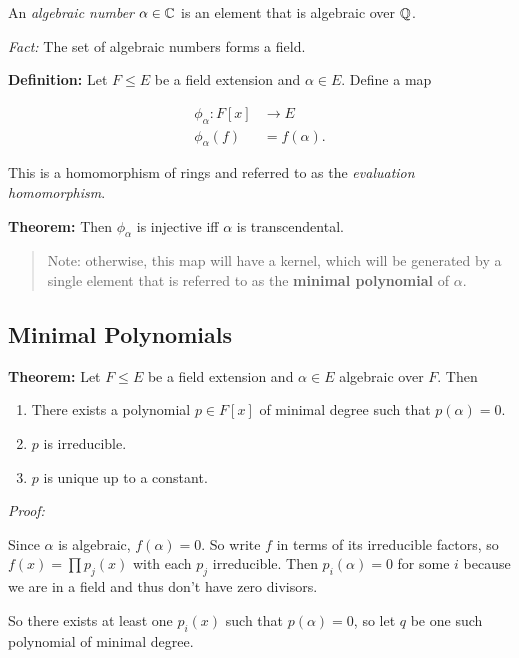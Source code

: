 An \emph{algebraic number} \(\alpha \in {\mathbb{C}}\) is an element that is
algebraic over \({\mathbb{Q}}\).

\emph{Fact:} The set of algebraic numbers forms a field.

\textbf{Definition:} Let \(F \leq E\) be a field extension and
\(\alpha \in E\). Define a map

\begin{align*}
\phi_\alpha: F[x] &\to E \\
\phi_\alpha(f) &= f(\alpha)
.\end{align*}

This is a homomorphism of rings and referred to as the \emph{evaluation
homomorphism}.

\textbf{Theorem:} Then \(\phi_\alpha\) is injective iff \(\alpha\) is
transcendental.

\begin{quote}
Note: otherwise, this map will have a kernel, which will be generated by
a single element that is referred to as the \textbf{minimal polynomial}
of \(\alpha\).
\end{quote}

\hypertarget{minimal-polynomials}{%
\subsection{Minimal Polynomials}\label{minimal-polynomials}}

\textbf{Theorem:} Let \(F\leq E\) be a field extension and
\(\alpha \in E\) algebraic over \(F\). Then

\begin{enumerate}
\def\labelenumi{\arabic{enumi}.}
\item
  There exists a polynomial \(p\in F[x]\) of minimal degree such that
  \(p(\alpha) = 0\).
\item
  \(p\) is irreducible.
\item
  \(p\) is unique up to a constant.
\end{enumerate}

\emph{Proof:}

Since \(\alpha\) is algebraic, \(f(\alpha) = 0\). So write \(f\) in
terms of its irreducible factors, so \(f(x) = \prod p_j(x)\) with each
\(p_j\) irreducible. Then \(p_i(\alpha) = 0\) for some \(i\) because we
are in a field and thus don't have zero divisors.

So there exists at least one \(p_i(x)\) such that \(p(\alpha) = 0\), so
let \(q\) be one such polynomial of minimal degree.

